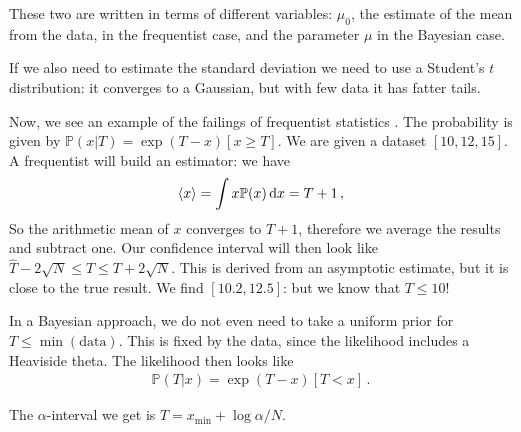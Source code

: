\documentclass[main.tex]{subfiles}
\begin{document}
These two are written in terms of different variables: \(\mu_0\), the estimate of the mean from the data, in the frequentist case, and the parameter \(\mu \) in the Bayesian case. 

If we also need to estimate the standard deviation we need to use a Student's \(t\) distribution: it converges to a Gaussian, but with few data it has fatter tails.

Now, we see an example of the failings of frequentist statistics \cite[]{FrequentismBayesianismIII}.
The probability is given by \(\mathbb{P}(x | T) = \exp(T - x) [x \geq T]\). We are given a dataset \([10, 12,  15]\). 
A frequentist will build an estimator: we have
%
\begin{align}
\expval{x} = \int x \mathbb{P}(x) \dd{x}  = T +1
\,,
\end{align}
%
So the arithmetic mean of \(x\) converges to \(T +1\), therefore we average the results and subtract one. 
Our confidence interval will then look like \(\hat{T} -2 \sqrt{N} \leq T \leq T + 2 \sqrt{N}\). 
This is derived from an asymptotic estimate, but it is close to the true result.
We find \([\num{10.2}, \num{12.5}]\): but we know that \(T \leq 10\)! 

In a Bayesian approach, we do not even need to take a uniform prior for \(T \leq \min (\text{data})\). This is fixed by the data, since the likelihood includes a Heaviside theta. 
The likelihood then looks like 
%
\begin{align}
\mathbb{P}(T | x) = \exp(T - x) [T < x]
\,.
\end{align}

The \(\alpha \)-interval we get is \(T = x _{\text{min}} + \log \alpha  / N\). 
\end{document}
